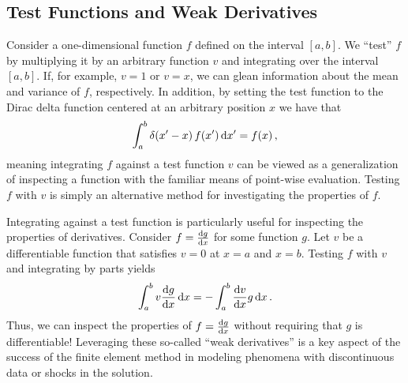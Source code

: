\documentclass[../doc.tex]{subfiles}
\begin{document}
\subsection{Test Functions and Weak Derivatives}
Consider a one-dimensional function $f$ defined on the interval $[a,b]$. We ``test'' $f$ by multiplying it by an arbitrary function $v$ and integrating over the interval $[a,b]$. If, for example, $v = 1$ or $v=x$, we can glean information about the mean and variance of $f$, respectively. In addition, by setting the test function to the Dirac delta function centered at an arbitrary position $x$ we have that 
	\begin{equation}
		\int_a^b \delta(x' - x)\, f(x') \mathop{}\!\mathrm{d} x' = f(x) \,, 
	\end{equation}
meaning integrating $f$ against a test function $v$ can be viewed as a generalization of inspecting a function with the familiar means of point-wise evaluation. Testing $f$ with $v$ is simply an alternative method for investigating the properties of $f$. 

Integrating against a test function is particularly useful for inspecting the properties of derivatives. Consider $f = \frac{\mathop{}\!\mathrm{d} g}{\mathop{}\!\mathrm{d} x}$ for some function $g$. Let $v$ be a differentiable function that satisfies $v = 0$ at $x = a$ and $x=b$. Testing $f$ with $v$ and integrating by parts yields 
	\begin{equation}
		\int_a^b v\frac{\mathop{}\!\mathrm{d} g}{\mathop{}\!\mathrm{d} x} \mathop{}\!\mathrm{d} x = -\int_a^b \frac{\mathop{}\!\mathrm{d} v}{\mathop{}\!\mathrm{d} x} g \mathop{}\!\mathrm{d} x \,. 
	\end{equation}
Thus, we can inspect the properties of $f = \frac{\mathop{}\!\mathrm{d} g}{\mathop{}\!\mathrm{d} x}$ without requiring that $g$ is differentiable! Leveraging these so-called ``weak derivatives'' is a key aspect of the success of the finite element method in modeling phenomena with discontinuous data or shocks in the solution. 
\end{document}
